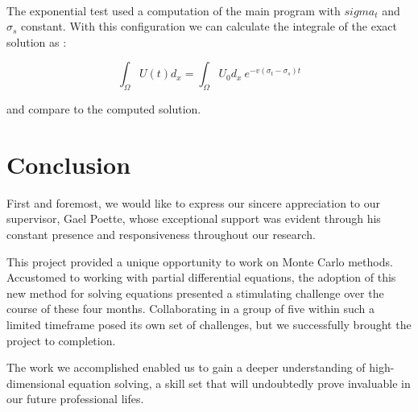 \documentclass[a4paper, 11pt]{article}
\begin{document}
\paragraph{}
The exponential test used a computation of the main program with $sigma_t$ and $\sigma_s$ constant. With this configuration we can calculate the integrale of the exact solution as :

$$\int_{\Omega} U(t)d_{x}=\int_{\Omega} U_0 d_{x} ~ e^{-v(\sigma_t-\sigma_s)t} $$

and compare to the computed solution.


\section{Conclusion}

First and foremost, we would like to express our sincere appreciation to our supervisor, Gael Poette, whose exceptional support was evident through his constant presence and responsiveness throughout our research.

This project provided a unique opportunity to work on Monte Carlo methods. Accustomed to working with partial differential equations, the adoption of this new method for solving equations presented a stimulating challenge over the course of these four months. Collaborating in a group of five within such a limited timeframe posed its own set of challenges, but we successfully brought the project to completion.

The work we accomplished enabled us to gain a deeper understanding of high-dimensional equation solving, a skill set that will undoubtedly prove invaluable in our future professional lifes.
	
	
	
\newpage

\nocite{*}


	
\end{document}
